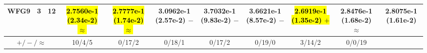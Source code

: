 \documentclass[journal]{IEEEtran}
\begin{document}
\begin{table*}[htbp]
\begin{tabular}{ccccccccccc}
\hline
\multirow{1}{*}{WFG9}&3&12&\hl{2.7560e-1 (2.34e-2) $\approx$}&\hl{2.7777e-1 (1.74e-2) $\approx$}&3.0962e-1 (2.57e-2) $-$&3.7032e-1 (9.83e-2) $-$&3.6621e-1 (8.57e-2) $-$&\hl{2.6919e-1 (1.35e-2) $+$}&2.8476e-1 (1.68e-2) $\approx$&2.8075e-1 (1.61e-2)\\
\hline
\multicolumn{3}{c}{$+/-/\approx$}&10/4/5&0/17/2&0/18/1&0/17/2&0/19/0&3/14/2&0/0/19&\\
\bottomrule
\end{tabular}
\label{No Label}
\end{table*}
\end{document}
